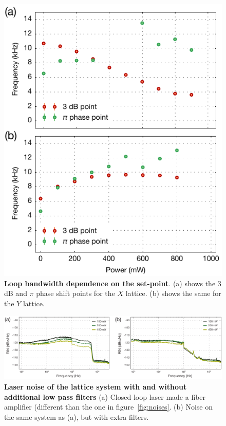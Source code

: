 \documentclass[twocolumn,aps,pra,showpacs,preprintnumbers,bibnotes]{revtex4-1}
\begin{document}
\begin{figure}
  \begin{center}
    \includegraphics{Figure10.pdf}
    \caption{\textbf{Loop bandwidth dependence on the set-point}. (a) shows the $3$ dB and $\pi$ phase shift points for the $X$ lattice. (b) shows the same for the $Y$ lattice.}\label{fig:bandwidth}
  \end{center}
\end{figure}

\begin{figure}
  \begin{center}
    \includegraphics{Figure11.pdf}
    \caption{\textbf{Laser noise of the lattice system with and without additional low pass filters} (a) Closed loop laser made a fiber amplifier (different than the one in figure~\ref{fig:noises}. (b) Noise on the same system as (a), but with extra filters.}\label{fig:low_pass_noises}
  \end{center}
\end{figure}
\end{document}
